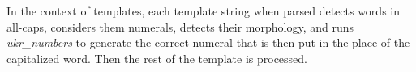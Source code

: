 In the context of templates, each template string when parsed detects words in all-caps, considers them 
numerals, detects their morphology, and runs \textit{ukr\_numbers} to generate the correct numeral that 
is then put in the place of the capitalized word. Then the rest of the template is processed.











